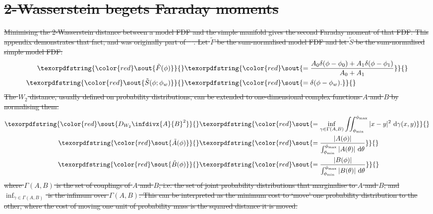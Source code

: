 \documentclass[11pt, a4paper]{book}
\providecommand{\DIFdeltex}[1]{{\protect\color{red}\sout{#1}}}                      %
\providecommand{\DIFdel}[1]{\texorpdfstring{\DIFdeltex{#1}}{}} %
\begin{document}
\section{\DIFdel{2-Wasserstein begets Faraday moments}}
\addtocounter{section}{-1}%
\DIFdel{Minimising the 2-Wasserstein distance between a model FDF and the simple manifold gives the second Faraday moment of that FDF. This appendix demonstrates that fact, and was originally part of \mbox{%
\citet{alger2021interpretable}}\hspace{0pt}%
. Let $\tilde F$ be the sum-normalised model FDF and let $\tilde S$ be the sum-normalised simple model FDF:
    }\begin{align*}
      \DIFdel{\tilde F(\phi) }&\DIFdel{= \frac{A_0 \delta(\phi - \phi_0) + A_1 \delta(\phi - \phi_1)}{A_0 + A_1}}\\
      \DIFdel{\tilde S(\phi; \phi_w) }&\DIFdel{= \delta(\phi - \phi_w).
    }\end{align*}%
\DIFdel{The $W_2$ distance, usually defined on probability distributions, can be extended to one-dimensional complex functions $A$ and $B$ by normalising them:
      }\begin{align*}
        \DIFdel{\label{eq:faraday-w2}
        D_{W_2}\infdivx{A}{B}^2 }&\DIFdel{= \inf_{\gamma \in \Gamma(A, B)} \iint_{\phi_{\min}}^{\phi_{\max}} |x - y|^2\ \mathrm{d}\gamma(x, y) }\\
        \DIFdel{%
        \tilde A(\phi) }&\DIFdel{= \frac{|A(\phi)|}{\int_{\phi_{\min}}^{\phi_{\max}} |A(\theta)|\ \mathrm{d}\theta}}\\
        \DIFdel{\tilde B(\phi) }&\DIFdel{= \frac{|B(\phi)|}{\int_{\phi_{\min}}^{\phi_{\max}} |B(\theta)|\ \mathrm{d}\theta}
      }\end{align*}%
\DIFdel{where $\Gamma(A, B)$ is the set of couplings of $A$ and $B$, i.e. the set of joint probability distributions that marginalise to $A$ and $B$; and $\inf_{\gamma \in \Gamma(A, B)}$ is the infimum over $\Gamma(A, B)$. This can be interpreted as the minimum cost to `move' one probability distribution to the other, where the cost of moving one unit of probability mass is the squared distance it is moved.
}%
\end{document}
